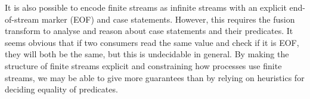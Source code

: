 It is also possible to encode finite streams as infinite streams with an explicit end-of-stream marker (EOF) and case statements. However, this requires the fusion transform to analyse and reason about case statements and their predicates. It seems obvious that if two consumers read the same value and check if it is EOF, they will both be the same, but this is undecidable in general. By making the structure of finite streams explicit and constraining how processes use finite streams, we may be able to give more guarantees than by relying on heuristics for deciding equality of predicates. 

% 
% 
% 

